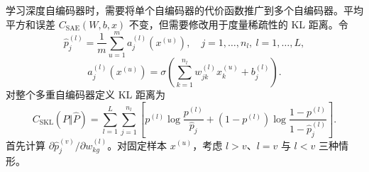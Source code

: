 
学习深度自编码器时，需要将单个自编码器的代价函数推广到多个自编码器。平均平方和误差 $C_{\mathrm{SAE}}(W,b,x)$ 不变，但需要修改用于度量稀疏性的 KL 距离。令
\begin{equation}
\widehat p_j^{(l)}=\frac1m\sum_{u=1}^ma_j^{(l)}(x^{(u)}),\quad j=1,\ldots,n_l,\ l=1,\ldots,L,
\tag{6.72}
\end{equation}
\begin{equation}
a_j^{(l)}(x^{(u)})=\sigma\left(\sum_{k=1}^{n_l}w_{jk}^{(l)}x_k^{(u)}+b_j^{(l)}\right).
\tag{6.73}
\end{equation}
对整个多重自编码器定义 KL 距离为
\begin{equation}
C_{\mathrm{SKL}}(P\Vert\widehat P)=\sum_{l=1}^L\sum_{j=1}^{n_l}
\left[p^{(l)}\log\frac{p^{(l)}}{\widehat p_j}+(1-p^{(l)})\log\frac{1-p^{(l)}}{1-\widehat p_j^{(l)}}\right].
\tag{6.74}
\end{equation}
首先计算 $\partial\widehat p_j^{(v)}/\partial w_{kg}^{(l)}$。对固定样本 $x^{(u)}$，考虑 $l>v$、$l=v$ 与 $l<v$ 三种情形。

